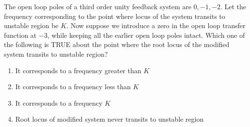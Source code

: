     \item The open loop poles of a third order unity feedback system are $0, -1, -2$. Let the frequency corresponding to the point where locus of the system transits to unstable region be $K$. Now suppose we introduce a zero in the open loop transfer function at $-3$, while keeping all the earlier open loop poles intact. Which one of the following is TRUE about the point where the root locus of the modified system transits to unstable region?
        \begin{enumerate}
            \item It corresponds to a frequency greater than $K$
            \item It corresponds to a frequency less than $K$
            \item It corresponds to a frequency $K$
            \item Root locus of modified system never transits to unstable region
        \end{enumerate}



